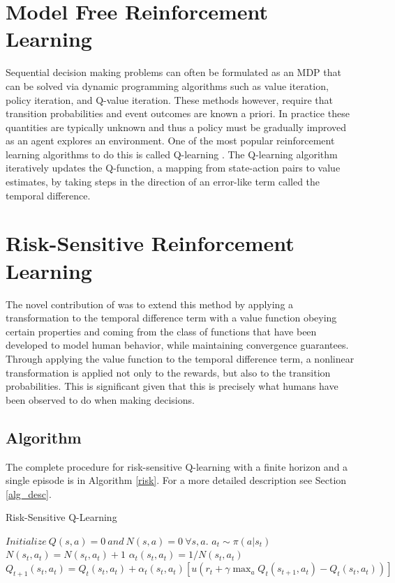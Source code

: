 \documentclass{article}
\begin{document}
\section{Model Free Reinforcement Learning}\label{sec:model_free}
Sequential decision making problems can often be formulated as an MDP that can be solved via dynamic programming algorithms such as value iteration, policy iteration, and Q-value iteration. These methods however, require that transition probabilities and event outcomes are known a priori. In practice these quantities are typically unknown and thus a policy must be gradually improved as an agent explores an environment. One of the most popular reinforcement learning algorithms to do this is called Q-learning \cite{sutton1998reinforcement}. The Q-learning algorithm iteratively updates the Q-function, a mapping from state-action pairs to value estimates, by taking steps in the direction of an error-like term called the temporal difference.



\section{Risk-Sensitive Reinforcement Learning}\label{sec:risk}
The novel contribution of \cite{DBLP:journals/corr/ShenTSO13} was to extend this method by applying a transformation to the temporal difference term with a value function obeying certain properties and coming from the class of functions that have been developed to model human behavior, while maintaining convergence guarantees. Through applying the value function to the temporal difference term, a nonlinear transformation is applied not only to the rewards, but also to the transition probabilities. This is significant given that this is precisely what humans have been observed to do when making decisions.


\subsection{Algorithm}
The complete procedure for risk-sensitive Q-learning with a finite horizon and a single episode is in Algorithm \ref{risk}. For a more detailed description see Section \ref{alg_desc}.
\begin{algorithm}
\caption{Risk-Sensitive Q-Learning}\label{risk}
\begin{algorithmic}[1]
\State $\textit{Initialize} \ Q(s, a) = 0 \ \textit{and} \ N(s, a) = 0 \ \forall s, a.$
    \State $a_t \sim \pi(a|s_t)$
    \State $N(s_t, a_t) = N(s_t, a_t) + 1$
    \State $\alpha_t(s_t, a_t) = 1/N(s_t, a_t)$
    \State $Q_{t+1}(s_t, a_t) = Q_t(s_t, a_t) + \alpha_t(s_t, a_t)\left[u(r_t + \gamma \max_a Q_t(s_{t+1}, a_t) - Q_t(s_t, a_t))\right]$
    \EndFor
\EndProcedure
\end{algorithmic}
\end{algorithm}
\vspace{-4mm}
\end{document}
